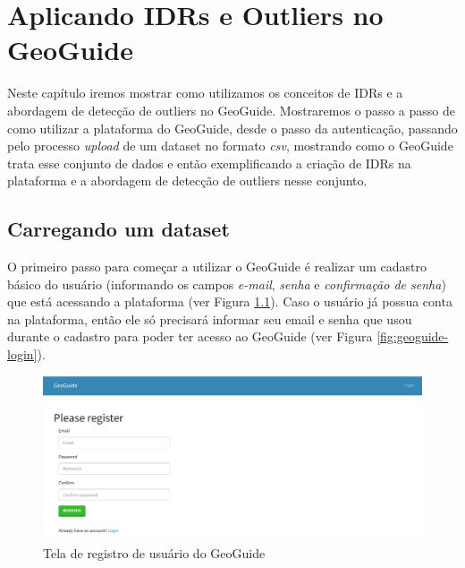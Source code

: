 \chapter{Aplicando IDRs e Outliers no GeoGuide}
\label{chap:aplicando}


Neste capítulo iremos mostrar como utilizamos os conceitos de IDRs e a abordagem de detecção de outliers no GeoGuide. Mostraremos o passo a passo de como utilizar a plataforma do GeoGuide, desde o passo da autenticação, passando pelo processo \textit{upload} de um dataset no formato \textit{csv}, mostrando como o GeoGuide trata esse conjunto de dados e então exemplificando a criação de IDRs na plataforma e a abordagem de detecção de outliers nesse conjunto.

\section{Carregando um dataset}

O primeiro passo para começar a utilizar o GeoGuide é realizar um cadastro básico do usuário (informando os campos \textit{e-mail}, \textit{senha} e \textit{confirmação de senha}) que está acessando a plataforma (ver Figura \ref{fig:geoguide-register}). Caso o usuário já possua conta na plataforma, então ele só precisará informar seu email e senha que usou durante o cadastro para poder ter acesso ao GeoGuide (ver Figura \ref{fig:geoguide-login}).

\begin{figure}[h]
	\centering
	\includegraphics[width=\textwidth]{images/geoguide-register.png}
	\caption{Tela de registro de usuário do GeoGuide}
	\label{fig:geoguide-register}
	\vspace{-10pt}
\end{figure}

